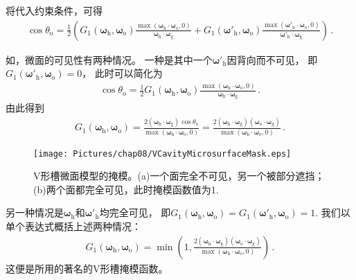 将代入约束条件，可得
\begin{align}\label{eq:08ex01-V-Cavity-configurations}
    \cos\theta_{\mathrm{o}}=\frac{1}{2}\left(
    G_1({\bm\omega}_{\mathrm{h}},{\bm\omega}_{\mathrm{o}})
    \frac{\max({\bm\omega}_{\mathrm{h}}\cdot{\bm\omega}_{\mathrm{o}},0)}
    {{\bm\omega}_{\mathrm{h}}\cdot{\bm\omega}_{\mathrm{g}}}
    +G_1({\bm\omega}'_{\mathrm{h}},{\bm\omega}_{\mathrm{o}})
    \frac{\max({\bm\omega}'_{\mathrm{h}}\cdot{\bm\omega}_{\mathrm{o}},0)}
    {{\bm\omega}'_{\mathrm{h}}\cdot{\bm\omega}_{\mathrm{g}}}\right)\, .
\end{align}

如，微面的可见性有两种情况。
一种是其中一个${\bm\omega}'_{\mathrm{h}}$因背向而不可见，
即$G_1({\bm\omega}'_{\mathrm{h}},{\bm\omega}_{\mathrm{o}})=0$，
此时可以简化为
\begin{align}
    \cos\theta_{\mathrm{o}}=\frac{1}{2}G_1({\bm\omega}_{\mathrm{h}},{\bm\omega}_{\mathrm{o}})
    \frac{\max({\bm\omega}_{\mathrm{h}}\cdot{\bm\omega}_{\mathrm{o}},0)}
    {{\bm\omega}_{\mathrm{h}}\cdot{\bm\omega}_{\mathrm{g}}}\, .
\end{align}
由此得到
\begin{align}
    G_1({\bm\omega}_{\mathrm{h}},{\bm\omega}_{\mathrm{o}})
    =\frac{2({\bm\omega}_{\mathrm{h}}\cdot{\bm\omega}_{\mathrm{g}})\cos\theta_{\mathrm{o}}}
    {\max({\bm\omega}_{\mathrm{h}}\cdot{\bm\omega}_{\mathrm{o}},0)}
    =\frac{2({\bm\omega}_{\mathrm{h}}\cdot{\bm\omega}_{\mathrm{g}})
    ({\bm\omega}_{\mathrm{o}}\cdot{\bm\omega}_{\mathrm{g}})}
    {\max({\bm\omega}_{\mathrm{h}}\cdot{\bm\omega}_{\mathrm{o}},0)}\, .
\end{align}

\begin{figure}[htbp]
    \centering
    \texttt{[image: Pictures/chap08/VCavityMicrosurfaceMask.eps]}
    \caption{V形槽微面模型的掩模。(a)一个面完全不可见，另一个被部分遮挡；
        (b)两个面都完全可见，此时掩模函数值为1.}
    \label{fig:08ex01-V-cavityScattering-Mask}
\end{figure}

另一种情况是${\bm\omega}_{\mathrm{h}}$和${\bm\omega}'_{\mathrm{h}}$均完全可见，
即$G_1({\bm\omega}_{\mathrm{h}},{\bm\omega}_{\mathrm{o}})=G_1({\bm\omega}'_{\mathrm{h}},{\bm\omega}_{\mathrm{o}})=1$.
我们以单个表达式概括上述两种情况：
\begin{align}\label{eq:08ex01-V-Cavity-MaskingFunction}
    G_1({\bm\omega}_{\mathrm{h}},{\bm\omega}_{\mathrm{o}})
    =\min\left(1, \frac{2({\bm\omega}_{\mathrm{h}}\cdot{\bm\omega}_{\mathrm{g}})
    ({\bm\omega}_{\mathrm{o}}\cdot{\bm\omega}_{\mathrm{g}})}
    {\max({\bm\omega}_{\mathrm{h}}\cdot{\bm\omega}_{\mathrm{o}},0)}\right)\, .
\end{align}
这便是\citet{10.1145/357290.357293}所用的著名的V形槽掩模函数。

